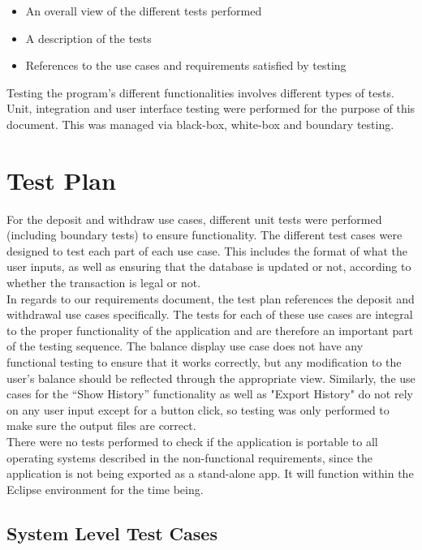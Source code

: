 \documentclass[12pt]{article}
\begin{document}
\begin{itemize}
  \item An overall view of the different tests performed
  \item A description of the tests
  \item References to the use cases and requirements satisfied by testing
\end{itemize}

Testing the program's different functionalities involves different types of tests. Unit, integration and user interface testing were performed for the purpose of this document. This was managed via black-box, white-box and boundary testing.

\section{Test Plan}

For the deposit and withdraw use cases, different unit tests were performed (including boundary tests) to ensure functionality. The different test cases were designed to test each part of each use case. This includes the format of what the user inputs, as well as ensuring that the database is updated or not, according to whether the transaction is legal or not.\\

In regards to our requirements document, the test plan references the deposit and withdrawal use cases specifically. The tests for each of these use cases are integral to the proper functionality of the application and are therefore an important part of the testing sequence. The balance display use case does not have any functional testing to ensure that it works correctly, but any modification to the user's balance should be reflected through the appropriate view. Similarly, the use cases for the “Show History” functionality as well as "Export History" do not rely on any user input except for a button click, so testing was only performed to make sure the output files are correct.\\

There were no tests performed to check if the application is portable to all operating systems described in the non-functional requirements, since the application is not being exported as a stand-alone app. It will function within the Eclipse environment for the time being.

\subsection{System Level Test Cases}
\end{document}
